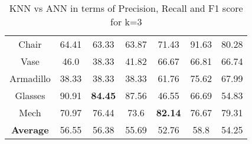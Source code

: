 \begin{table}[H]
\begin{tabular}{c|c|c|c|c|c|c}
        Chair & 64.41 & 63.33 & 63.87 & 71.43 & 91.63 & 80.28 \\ 
        Vase & 46.0 & 38.33 & 41.82 & 66.67 & 66.81 & 66.74 \\ 
        Armadillo & 38.33 & 38.33 & 38.33 & 61.76 & 75.62 & 67.99 \\ 
        Glasses & 90.91 & \textbf{84.45} & 87.56 & 46.55 & 66.69 & 54.83 \\ 
        Mech & 70.97 & 76.44 & 73.6 & \textbf{82.14} & 76.67 & 79.31 \\
        \hline
        \textbf{Average} & 56.55 & 56.38 & 55.69 & 52.76 & 58.8 & 54.25\\
    \end{tabular}
    \caption{KNN vs ANN in terms of Precision, Recall and F1 score for k=3}
    \label{tab:precision-recall-f1-k-3}
\end{table}

